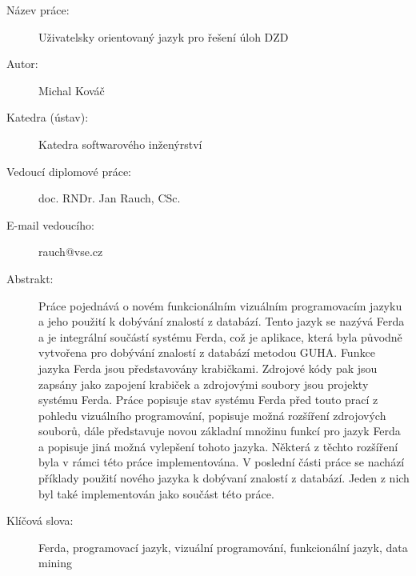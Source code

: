 \documentclass[a4paper,12pt]{book}
\begin{document}
\newpage
{\footnotesize
{}
\begin{description}
 \item [Název práce:] Uživatelsky orientovaný jazyk pro řešení úloh DZD
 \item [Autor:] Michal Kováč
 \item [Katedra (ústav):] Katedra softwarového inženýrství
 \item [Vedoucí diplomové práce:] doc. RNDr. Jan Rauch, CSc.
 \item [E-mail vedoucího:] rauch@vse.cz
 \item [Abstrakt:] Práce pojednává o novém funkcionálním vizuálním programovacím jazyku a jeho použití k dobývání znalostí z databází. Tento jazyk se nazývá Ferda a je integrální součástí systému Ferda, což je aplikace, která byla původně vytvořena pro dobývání znalostí z databází metodou GUHA. Funkce jazyka Ferda jsou před\-sta\-vo\-vá\-ny krabičkami. Zdrojové kódy pak jsou zapsány jako zapojení krabiček a zdrojovými soubory jsou projekty systému Ferda. Práce popisuje stav systému Ferda před touto prací z pohledu vizuálního programování, popisuje možná rozšíření zdrojových souborů, dále představuje novou základní množinu funkcí pro jazyk Ferda a popisuje jiná možná vylepšení tohoto jazyka. Některá z těchto rozšíření byla v rámci této práce implementována. V poslední části práce se nachází příklady použití nového jazyka k dobývaní znalostí z databází. Jeden z nich byl také implementován jako
součást této práce.


 \item [Klíčová slova:] Ferda, programovací jazyk, vizuální programování, funkcionální jazyk, data mining
\end{description}

\medskip

}
\end{document}
